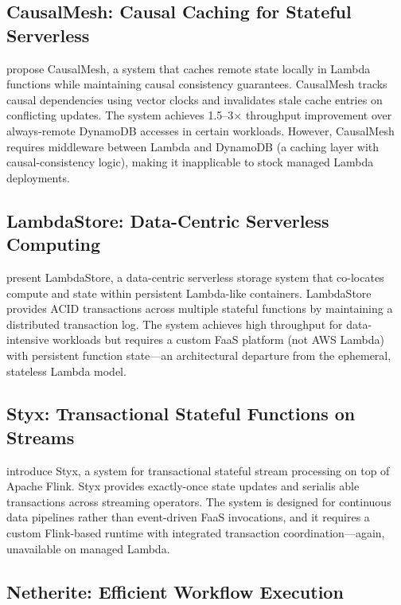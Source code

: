 \subsection{CausalMesh: Causal Caching for Stateful Serverless}

\citet{Zhang2024CausalMesh} propose CausalMesh, a system that caches remote state locally in Lambda functions while maintaining causal consistency guarantees. CausalMesh tracks causal dependencies using vector clocks and invalidates stale cache entries on conflicting updates. The system achieves 1.5--3$\times$ throughput improvement over always-remote DynamoDB accesses in certain workloads. However, CausalMesh requires middleware between Lambda and DynamoDB (a caching layer with causal-consistency logic), making it inapplicable to stock managed Lambda deployments.

\subsection{LambdaStore: Data-Centric Serverless Computing}

\citet{Mast2026LambdaStore} present LambdaStore, a data-centric serverless storage system that co-locates compute and state within persistent Lambda-like containers. LambdaStore provides ACID transactions across multiple stateful functions by maintaining a distributed transaction log. The system achieves high throughput for data-intensive workloads but requires a custom FaaS platform (not AWS Lambda) with persistent function state---an architectural departure from the ephemeral, stateless Lambda model.

\subsection{Styx: Transactional Stateful Functions on Streams}

\citet{Psarakis2025Styx} introduce Styx, a system for transactional stateful stream processing on top of Apache Flink. Styx provides exactly-once state updates and serialis able transactions across streaming operators. The system is designed for continuous data pipelines rather than event-driven FaaS invocations, and it requires a custom Flink-based runtime with integrated transaction coordination---again, unavailable on managed Lambda.

\subsection{Netherite: Efficient Workflow Execution}

